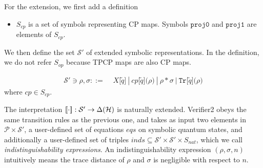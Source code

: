For the extension, we first add a definition
\begin{itemize}
 \item $S_{\mathit{cp}}$ is a set of symbols representing CP maps.
       Symbols $\mathtt{proj0}$ and $\mathtt{proj1}$ are elements of
       $S_{\mathit{cp}}$.
\end{itemize}
We then define the set $\mathcal{S}'$ of extended
symbolic representations. In the definition, 
we do not refer $S_\mathit{op}$ because
TPCP maps are also CP maps.
\begin{defi}
\label{neg:exsymbrep}
\begin{align*}
\mathcal{S}' \ni \rho, \sigma ::=\,\, &X\mathtt{[}\tilde q\mathtt{]} ~|~
\mathit{cp}\mathtt{[}\tilde q\mathtt{](}\rho\mathtt{)} ~|~ \rho \,
  \mathtt{*} \, \sigma
~|~\mathtt{Tr}\mathtt{[}\tilde q\mathtt{](}\rho\mathtt{)}
\end{align*}
where $\mathit{cp} \in S_{\mathit{cp}}$.
\end{defi}

The interpretation $[\![\cdot]\!]:\mathcal{S}' \rightarrow \Delta(\mathcal{H})$
is naturally extended.
Verifier2 obeys the same transition rules as the
previous one, and
takes as input two elements in
$\mathcal{P} \times \mathcal{S'}$,
a user-defined set of equations $\mathit{eqs}$
on symbolic quantum states,
and additionally a user-defined set of triples
$\mathit{inds} \subseteq \mathcal{S'} \times \mathcal{S'} \times
S_\mathit{nat}$, which we call {\it indistinguishability expressions}.
An indistinguishability expression $(\rho, \sigma, n)$ intuitively means
the trace distance of $\rho$ and $\sigma$ is negligible with respect to
$n$.


